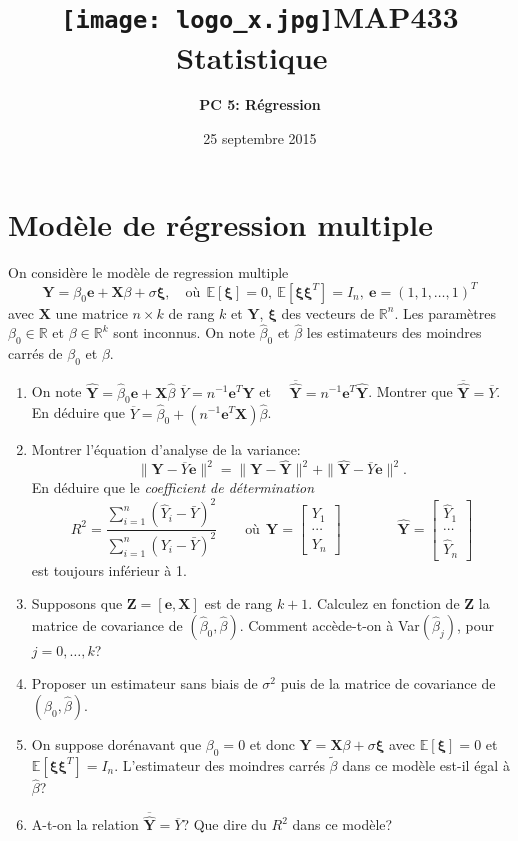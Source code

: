 \documentclass[a4paper,11pt,fleqn]{article}
\title{\texttt{[image: logo\_x.jpg]}\hfill {\bf MAP433 Statistique}\hfill \quad\quad\quad\quad\quad\quad \ }
\author{{\bf PC 5: R\'egression}}
\date{25 septembre 2015}
\newcommand{\R}{\ensuremath{\mathbb{R}}}
\newcommand{\E}{\ensuremath{\mathbb{E}}}
\newcommand{\1}{\ensuremath{\mathbbm{1}}}
\newcommand{\bY}{\mathbf{Y}}
\newcommand{\hatbY}{\widehat{\bY}}
\newcommand{\be}{\mathbf{e}}
\newcommand{\X}{\mathbf{X}}
\newcommand{\bZ}{\mathbf{Z}}
\newcommand{\bxi}{\mathbf{\xi}}
\begin{document}
\maketitle




\section{Mod\`ele de r\'egression multiple}
On consid\`ere le mod\`ele de regression multiple
\[
\bY = \beta_{0} \be + \X \beta+ \sigma \bxi, \quad\textrm{o\`u}\ \ 
\E[\bxi]=0,~\E[\bxi \bxi^T]= I_n,\ \be=(1,1,\ldots,1)^T
\] avec $\X$ une
matrice $n\times k$ de rang $k$ et $\bY$, $\bxi$ des vecteurs de
$\mathbb{R}^n$.  Les param\`etres $\beta_{0}\in\R$ et $\beta\in\R^k$ sont
inconnus. On note $\hat \beta_{0}$ et $\hat \beta$ les estimateurs des moindres
carr\'es de $\beta_{0}$ et $\beta$.
\begin{enumerate}
\item On note \quad $\hatbY = \hat \beta_{0} \be+ \X \hat \beta$ \qquad
  $\overline Y= n^{-1} \be^T \bY$ et $\quad \overline{\hatbY} = n^{-1} \be^T
  \hatbY$. Montrer que $\overline{\hatbY} =\overline Y$.  En d\'eduire que
  $\overline Y = \hat\beta_{0}+ \left(n^{-1} \be^T \X \right) \hat \beta$.
\item Montrer l'\'equation d'analyse de la variance:
  $$\|\bY- \overline Y \be\|^2=\|\bY-\hatbY\|^2+\|\hatbY-\overline Y \be\|^2.$$
  En
  d\'eduire que le {\it coefficient de d\'etermination}
  $$R^2=\frac{\sum_{i=1}^n(\hat Y_i-\bar Y)^2}{\sum_{i=1}^n(Y_i-\bar Y)^2}
  \qquad \text{o\`u} \ \ \bY = 
  \begin{bmatrix}
    Y_1 \\
    \cdots \\
    Y_n
  \end{bmatrix} \qquad \qquad \hatbY = 
  \begin{bmatrix}
    \hat Y_1 \\
    \cdots \\
    \hat Y_n
  \end{bmatrix}
  $$
  est toujours inf\'erieur \`a 1.
\item Supposons que $\bZ=[\be,\X]$ est de rang $k+1$.  Calculez en fonction de
  $\bZ$ la matrice de covariance de $(\hat \beta_{0},\hat\beta)$. Comment
  acc\`ede-t-on \`a Var$(\hat\beta_{j})$, pour $j=0,\ldots,k$?
\item Proposer un estimateur sans biais de $\sigma^2$ puis de la matrice de
  covariance de $(\hat \beta_{0},\hat \beta)$.
\item On suppose dor\'enavant que $\beta_{0}=0$ et donc \quad $\bY=\X \beta+
  \sigma \bxi$ \quad avec $\E[\bxi]=0$ et $\E[\bxi\bxi^T]=I_n$.  L'estimateur
  des moindres carr\'es $\tilde \beta$ dans ce mod\`ele est-il \'egal \`a $\hat
  \beta$?
\item A-t-on la relation $\overline{\hatbY} =\overline Y$? Que dire du $R^2$
  dans ce mod\`ele?
\end{enumerate}
\end{document}
